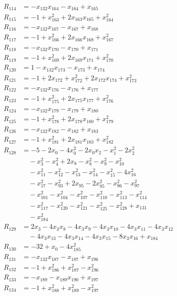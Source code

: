 \begin{align*}
R_{114}&=-x_{132}x_{164}-x_{164}+x_{165}\\
R_{115}&=-1+x_{163}^{2}+2x_{163}x_{165}+x_{164}^{2}\\
R_{116}&=-x_{132}x_{167}-x_{167}+x_{168}\\
R_{117}&=-1+x_{166}^{2}+2x_{166}x_{168}+x_{167}^{2}\\
R_{118}&=-x_{132}x_{170}-x_{170}+x_{171}\\
R_{119}&=-1+x_{169}^{2}+2x_{169}x_{171}+x_{170}^{2}\\
R_{120}&=1-x_{132}x_{173}-x_{173}+x_{174}\\
R_{121}&=-1+2x_{172}+x_{172}^{2}+2x_{172}x_{174}+x_{173}^{2}\\
R_{122}&=-x_{132}x_{176}-x_{176}+x_{177}\\
R_{123}&=-1+x_{175}^{2}+2x_{175}x_{177}+x_{176}^{2}\\
R_{124}&=-x_{132}x_{179}-x_{179}+x_{180}\\
R_{125}&=-1+x_{178}^{2}+2x_{178}x_{180}+x_{179}^{2}\\
R_{126}&=-x_{132}x_{182}-x_{182}+x_{183}\\
R_{127}&=-1+x_{181}^{2}+2x_{181}x_{183}+x_{182}^{2}\\
R_{128}&=-5-2x_{0}-4x_{0}^{2}-2x_{0}x_{2}-x_{1}^{2}-2x_{2}^{2}\\
&\quad{}-x_{3}^{2}-x_{4}^{2}+2x_{8}-x_{8}^{2}-x_{9}^{2}-x_{10}^{2}\\
&\quad{}-x_{11}^{2}-x_{12}^{2}-x_{13}^{2}-x_{14}^{2}-x_{15}^{2}-4x_{16}^{2}\\
&\quad{}-x_{17}^{2}-x_{93}^{2}+2x_{95}-2x_{95}^{2}-x_{96}^{2}-x_{97}^{2}\\
&\quad{}-x_{101}^{2}-x_{104}^{2}-x_{107}^{2}-x_{110}^{2}-x_{113}^{2}-x_{114}^{2}\\
&\quad{}-x_{117}^{2}-x_{120}^{2}-x_{121}^{2}-x_{125}^{2}-x_{128}^{2}+x_{131}\\
&\quad{}-x_{184}^{2}\\
R_{129}&=2x_{3}-4x_{3}x_{8}-4x_{3}x_{9}-4x_{3}x_{10}-4x_{3}x_{11}-4x_{3}x_{12}\\
&\quad{}-4x_{3}x_{13}-4x_{3}x_{14}-4x_{3}x_{15}-8x_{3}x_{16}+x_{184}\\
R_{130}&=-32+x_{0}-4x_{185}^{2}\\
R_{131}&=-x_{132}x_{187}-x_{187}+x_{196}\\
R_{132}&=-1+x_{186}^{2}+x_{187}^{2}-x_{196}^{2}\\
R_{133}&=-x_{189}-x_{189}x_{190}+x_{197}\\
R_{134}&=-1+x_{188}^{2}+x_{189}^{2}-x_{197}^{2}\\

\end{align*}
